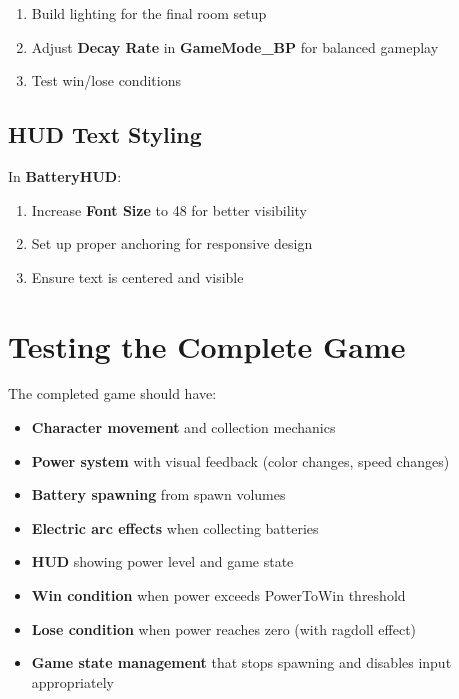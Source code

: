 \documentclass[
  letterpaper,
  DIV=11,
  numbers=noendperiod]{scrartcl}
\providecommand{\tightlist}{%
  \setlength{\itemsep}{0pt}\setlength{\parskip}{0pt}}
\begin{document}
\begin{enumerate}
\def\labelenumi{\arabic{enumi}.}
\tightlist
\item
  Build lighting for the final room setup
\item
  Adjust \textbf{Decay Rate} in \textbf{GameMode\_BP} for balanced
  gameplay
\item
  Test win/lose conditions
\end{enumerate}

\subsection{HUD Text Styling}\label{hud-text-styling}

In \textbf{BatteryHUD}:

\begin{enumerate}
\def\labelenumi{\arabic{enumi}.}
\tightlist
\item
  Increase \textbf{Font Size} to 48 for better visibility
\item
  Set up proper anchoring for responsive design
\item
  Ensure text is centered and visible
\end{enumerate}

\section{Testing the Complete Game}\label{testing-the-complete-game}

The completed game should have:

\begin{itemize}
\tightlist
\item
  \textbf{Character movement} and collection mechanics
\item
  \textbf{Power system} with visual feedback (color changes, speed
  changes)
\item
  \textbf{Battery spawning} from spawn volumes
\item
  \textbf{Electric arc effects} when collecting batteries
\item
  \textbf{HUD} showing power level and game state
\item
  \textbf{Win condition} when power exceeds PowerToWin threshold
\item
  \textbf{Lose condition} when power reaches zero (with ragdoll effect)
\item
  \textbf{Game state management} that stops spawning and disables input
  appropriately
\end{itemize}
\end{document}
